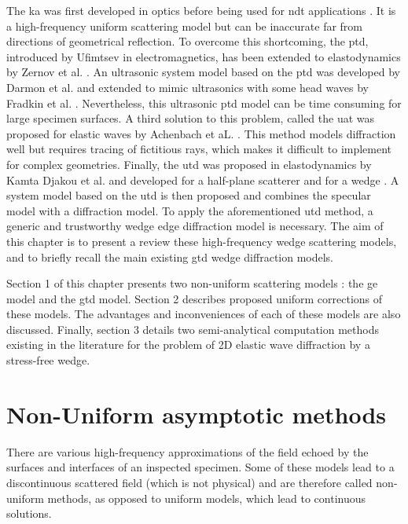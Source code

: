 The \acrfull{ka} was first developed in optics \cite{POoptics} before being used for \acrshort{ndt} applications \cite{Schmerr,Dorval}. It is a high-frequency uniform scattering model but can be inaccurate far from directions of geometrical reflection. To overcome this shortcoming, the \acrfull{ptd}, introduced by Ufimtsev \cite{Ufmi} in electromagnetics, has been extended to elastodynamics by Zernov et al. \cite{Zernov}. An ultrasonic system model based on the \acrshort{ptd} was developed by Darmon et al. \cite{systmodel} and extended to mimic ultrasonics with some head waves by Fradkin et al. \cite{FradkinDarmon}. Nevertheless, this ultrasonic \acrshort{ptd} model can be time consuming for large specimen surfaces. A third solution to this problem, called the \acrfull{uat} was proposed for elastic waves by Achenbach et aL. \cite{Achenbach}. This method models diffraction well but requires tracing of fictitious rays, which makes it difficult to implement for complex geometries. Finally, the \acrfull{utd} was proposed in elastodynamics by Kamta Djakou et al. and developed for a half-plane scatterer \cite{Audrey} and for a wedge \cite{AKDthese}. A system model based on the \acrshort{utd} is then proposed and combines the specular model with a diffraction model. To apply the aforementioned \acrshort{utd} method, a generic and trustworthy wedge edge diffraction model is necessary. The aim of this chapter is to present a review these high-frequency wedge scattering models, and to briefly recall the main existing \acrshort{gtd} wedge diffraction models.

Section 1 of this chapter presents two non-uniform scattering models : the \acrshort{ge} model and the \acrshort{gtd} model. Section 2 describes proposed uniform corrections of these models. The advantages and inconveniences of each of these models are also discussed. Finally, section 3 details two semi-analytical computation methods existing in the literature for the problem of 2D elastic wave diffraction by a stress-free wedge.

\section{Non-Uniform asymptotic methods}

There are various high-frequency approximations of the field echoed by the surfaces and interfaces of an inspected specimen. Some of these models lead to a discontinuous scattered field (which is not physical) and are therefore called non-uniform methods, as opposed to uniform models, which lead to continuous solutions.
